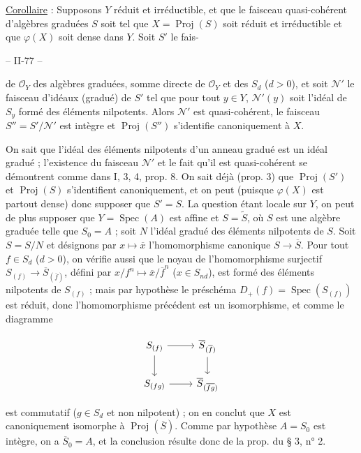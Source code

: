 \underline{Corollaire} : Supposons $Y$ réduit et irréductible, et que le faisceau quasi-cohérent d'algèbres graduées $S$ soit tel que $X = \operatorname{Proj}(S)$ soit réduit et irréductible et que $\varphi(X)$ soit dense dans $Y$. Soit $S'$ le fais-

\newpage


\noindent -- II-77 --

\noindent de $\mathcal{O}_Y$ des algèbres graduées, somme directe de $\mathcal{O}_Y$ et des $S_d$ ($d > 0$), et soit $\mathcal{N}'$ le faisceau d'idéaux (gradué) de $S'$ tel que pour tout $y \in Y$, $\mathcal{N}'(y)$ soit l'idéal de $S_y$ formé des éléments nilpotents. Alors $\mathcal{N}'$ est quasi-cohérent, le faisceau $S'' = S'/\mathcal{N}'$ est intègre et $\operatorname{Proj}(S'')$ s'identifie canoniquement à $X$.

\noindent On sait que l'idéal des éléments nilpotents d'un anneau gradué est un idéal gradué ; l'existence du faisceau $\mathcal{N}'$ et le fait qu'il est quasi-cohérent se démontrent comme dans I, 3, 4, prop. 8. On sait déjà (prop. 3) que $\operatorname{Proj}(S')$ et $\operatorname{Proj}(S)$ s'identifient canoniquement, et on peut (puisque $\varphi(X)$ est partout dense) donc supposer que $S'=S$. La question étant locale sur $Y$, on peut de plus supposer que $Y = \operatorname{Spec}(A)$ est affine et $S = \tilde{S}$, où $S$ est une algèbre graduée telle que $S_0 = A$ ; soit $N$ l'idéal gradué des éléments nilpotents de $S$. Soit $S = S/N$ et désignons par $x \mapsto \overline{x}$ l'homomorphisme canonique $S \to \overline{S}$. Pour tout $f \in S_d$ ($d > 0$), on vérifie aussi que le noyau de l'homomorphisme surjectif $S_{(f)} \to \overline{S}_{(\overline{f})}$, défini par $x/f^n \mapsto \overline{x}/\overline{f}^n$ ($x \in S_{nd}$), est formé des éléments nilpotents de $S_{(f)}$ ; mais par hypothèse le préschéma $D_+(f) = \operatorname{Spec}(S_{(f)})$ est réduit, donc l'homomorphisme précédent est un isomorphisme, et comme le diagramme

$$
\begin{tikzcd}
S_{(f)} \arrow[r] \arrow[d] & \overline{S}_{(\overline{f})} \arrow[d] \\
S_{(fg)} \arrow[r] & \overline{S}_{(\overline{fg})}
\end{tikzcd}
$$

\noindent est commutatif ($g \in S_d$ et non nilpotent) ; on en conclut que $X$ est canoniquement isomorphe à $\operatorname{Proj}(\overline{S})$. Comme par hypothèse $A = S_0$ est intègre, on a $\overline{S}_0 = A$, et la conclusion résulte donc de la prop. du § 3, n° 2.

